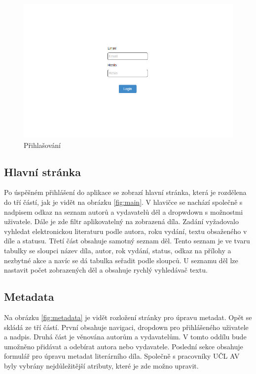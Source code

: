             \begin {figure}[H]\centering
                \includegraphics[width=\textwidth]{images/login}
                \caption {Přihlašování}
                \label {fig:login}
            \end{figure}
            
        \subsection{Hlavní stránka}
            Po úspěšném přihlášení do aplikace se zobrazí hlavní stránka, která je rozdělena do tří částí, jak je vidět na obrázku \ref{fig:main}. V hlavičce se nachází společně s nadpisem odkaz na seznam autorů a vydavatelů děl a dropwdown s možnostmi uživatele. Dále je zde filtr aplikovatelný na zobrazená díla. Zadání vyžadovalo vyhledat elektronickou literaturu podle autora, roku vydání, textu obsaženého v díle a statusu. Třetí část obsahuje samotný seznam děl. Tento seznam je ve tvaru tabulky se sloupci název díla, autor, rok vydání, status, odkaz na přílohy a nezbytné akce a navíc se dá tabulka seřadit podle sloupců. U seznamu děl lze nastavit počet zobrazených děl a obsahuje rychlý vyhledávač textu.

        \subsection{Metadata}
            Na obrázku \ref{fig:metadata} je vidět rozložení stránky pro úpravu metadat. Opět se skládá ze tří částí. První obsahuje navigaci, dropdown pro přihlášeného uživatele a nadpis. Druhá část je věnována autorům a vydavatelům. V tomto oddílu bude umožněno přidávat a odebírat autora nebo vydavatele. Poslední sekce obsahuje formulář pro úpravu metadat literárního díla. Společně s pracovníky UČL AV byly vybrány nejdůležitější atributy, které je zde možno upravit. 
        
